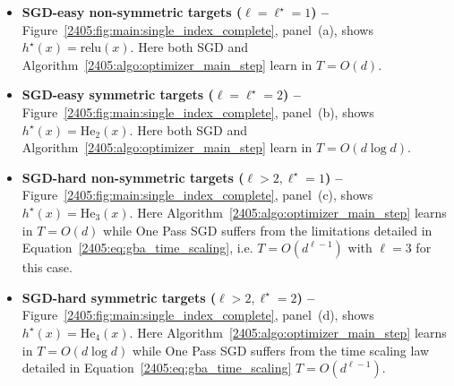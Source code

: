 \begin{itemize}
    \item \textbf{SGD-easy non-symmetric targets ($\ell = \ell^\star =1$) --} Figure~\ref{2405:fig:main:single_index_complete}, panel~(a), shows $h^\star(x) = \mathrm{relu}(x)$. Here both SGD and Algorithm~\ref{2405:algo:optimizer_main_step} learn in $T= O(d)$.
    \item \textbf{SGD-easy symmetric targets ($\ell = \ell^\star = 2$) -- } Figure~\ref{2405:fig:main:single_index_complete}, panel~(b), shows $ h^\star(x) = \mathrm{He}_2(x)$. Here both SGD and Algorithm~\ref{2405:algo:optimizer_main_step} learn in $T=O(d \log d)$. 
    \item \textbf{SGD-hard non-symmetric targets ($\ell > 2, \ell^\star =1$) -- }  Figure~\ref{2405:fig:main:single_index_complete}, panel~(c), shows $ h^\star(x) = \mathrm{He}_3(x)$. Here Algorithm~\ref{2405:algo:optimizer_main_step} learns in $T=O(d)$ while One Pass SGD suffers from the limitations detailed in Equation~\eqref{2405:eq:gba_time_scaling}, i.e. $T= O(d^{\ell-1})$ with $\ell=3$ for this case.
    \item \textbf{SGD-hard symmetric targets ($\ell > 2, \ell^\star =2$) -- } Figure~\ref{2405:fig:main:single_index_complete}, panel~(d), shows $h^\star(x) = \mathrm{He}_4(x)$. Here Algorithm~\ref{2405:algo:optimizer_main_step} learns in $T=O(d \log d)$ while One Pass SGD suffers from the time scaling law detailed in Equation~\eqref{2405:eq:gba_time_scaling} $T= O(d^{\ell-1})$.
\end{itemize}
